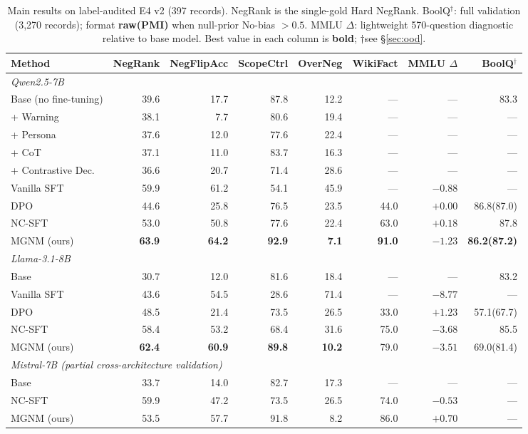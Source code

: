 \documentclass[letterpaper]{article}
\begin{document}
\begin{table}[t]
\centering
\small
\caption{Main results on label-audited E4 v2 (397 records). NegRank is the
  single-gold Hard NegRank. BoolQ$^\dagger$: full validation
  (3,270 records); format \textbf{raw(PMI)} when null-prior No-bias $>0.5$.
  MMLU $\Delta$: lightweight 570-question diagnostic relative to base model.
  Best value in each column is \textbf{bold}; $\dagger$see \S\ref{sec:ood}.}
\label{tab:main}
\setlength{\tabcolsep}{5pt}
\begin{tabular}{lrrrrrrr}
\toprule
Method & NegRank & NegFlipAcc & ScopeCtrl & OverNeg & WikiFact & MMLU $\Delta$ & BoolQ$^\dagger$ \\
\midrule
\multicolumn{8}{l}{\textit{Qwen2.5-7B}} \\
Base (no fine-tuning) & 39.6 & 17.7 & 87.8 & 12.2 & --- & --- & 83.3 \\
\quad + Warning & 38.1 & \phantom{0}7.7 & 80.6 & 19.4 & --- & --- & --- \\
\quad + Persona & 37.6 & 12.0 & 77.6 & 22.4 & --- & --- & --- \\
\quad + CoT & 37.1 & 11.0 & 83.7 & 16.3 & --- & --- & --- \\
\quad + Contrastive Dec. & 36.6 & 20.7 & 71.4 & 28.6 & --- & --- & --- \\
Vanilla SFT & 59.9 & 61.2 & 54.1 & 45.9 & --- & $-0.88$ & --- \\
DPO & 44.6 & 25.8 & 76.5 & 23.5 & 44.0 & $+0.00$ & 86.8(87.0) \\
NC-SFT & 53.0 & 50.8 & 77.6 & 22.4 & 63.0 & $+0.18$ & 87.8 \\
MGNM (ours) & \textbf{63.9} & \textbf{64.2} & \textbf{92.9} & \phantom{0}\textbf{7.1} & \textbf{91.0} & $-1.23$ & \textbf{86.2(87.2)} \\
\midrule
\multicolumn{8}{l}{\textit{Llama-3.1-8B}} \\
Base & 30.7 & 12.0 & 81.6 & 18.4 & --- & --- & 83.2 \\
Vanilla SFT & 43.6 & 54.5 & 28.6 & 71.4 & --- & $-8.77$ & --- \\
DPO & 48.5 & 21.4 & 73.5 & 26.5 & 33.0 & $+1.23$ & 57.1(67.7) \\
NC-SFT & 58.4 & 53.2 & 68.4 & 31.6 & 75.0 & $-3.68$ & 85.5 \\
MGNM (ours) & \textbf{62.4} & \textbf{60.9} & \textbf{89.8} & \phantom{0}\textbf{10.2} & 79.0 & $-3.51$ & 69.0(81.4) \\
\midrule
\multicolumn{8}{l}{\textit{Mistral-7B (partial cross-architecture validation)}} \\
Base & 33.7 & 14.0 & 82.7 & 17.3 & --- & --- & --- \\
NC-SFT & 59.9 & 47.2 & 73.5 & 26.5 & 74.0 & $-0.53$ & --- \\
MGNM (ours) & 53.5 & 57.7 & 91.8 & \phantom{0}8.2 & 86.0 & $+0.70$ & --- \\
\bottomrule
\end{tabular}
\end{table}
\end{document}
